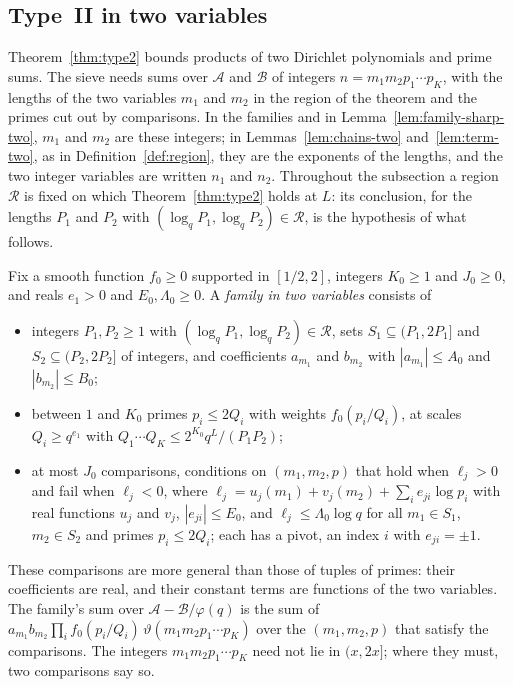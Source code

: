 \documentclass[11pt]{article}
\theoremstyle{definition}
\begin{document}
\subsection{Type~II in two variables}\label{sec:family-two}

Theorem~\ref{thm:type2} bounds products of two Dirichlet polynomials and prime sums. The sieve needs sums over
$\mathcal A$ and $\mathcal B$ of integers $n = m_1 m_2 p_1 \cdots p_K$, with the lengths of the two variables $m_1$ and
$m_2$ in the region of the theorem and the primes cut out by comparisons. In the families and in
Lemma~\ref{lem:family-sharp-two}, $m_1$ and $m_2$ are these integers; in Lemmas~\ref{lem:chains-two}
and~\ref{lem:term-two}, as in Definition~\ref{def:region}, they are the exponents of the lengths, and the two integer
variables are written $n_1$ and $n_2$. Throughout the subsection a region $\mathcal R$ is fixed on
which Theorem~\ref{thm:type2} holds at $L$: its conclusion, for the lengths $P_1$ and $P_2$ with
$(\log_q P_1, \log_q P_2) \in \mathcal R$, is the hypothesis of what follows.

Fix a smooth function $f_0 \ge 0$ supported in $[1/2, 2]$, integers $K_0 \ge 1$ and $J_0 \ge 0$, and reals $e_1 > 0$ and
$E_0, \Lambda_0 \ge 0$. A \emph{family in two variables} consists of
\begin{itemize}
\item integers $P_1, P_2 \ge 1$ with $(\log_q P_1, \log_q P_2) \in \mathcal R$, sets $S_1 \subseteq (P_1, 2P_1]$ and
  $S_2 \subseteq (P_2, 2P_2]$ of integers, and coefficients $a_{m_1}$ and $b_{m_2}$ with $|a_{m_1}| \le A_0$ and
  $|b_{m_2}| \le B_0$;
\item between $1$ and $K_0$ primes $p_i \le 2Q_i$ with weights $f_0(p_i/Q_i)$, at scales $Q_i \ge q^{e_1}$ with $Q_1
  \cdots Q_K \le 2^{K_0} q^L/(P_1 P_2)$;
\item at most $J_0$ comparisons, conditions on $(m_1, m_2, p)$ that hold when $\ell_j > 0$ and fail when $\ell_j < 0$,
  where $\ell_j = u_j(m_1) + v_j(m_2) + \sum_i e_{ji} \log p_i$ with real functions $u_j$ and $v_j$,
  $|e_{ji}| \le E_0$, and $\ell_j \le \Lambda_0 \log q$ for all $m_1 \in S_1$, $m_2 \in S_2$ and primes $p_i \le 2Q_i$;
  each has a pivot, an index $i$ with $e_{ji} = \pm 1$.
\end{itemize}
These comparisons are more general than those of tuples of primes: their coefficients are real, and their constant terms
are functions of the two variables. The family's sum over $\mathcal A - \mathcal B/\varphi(q)$ is the sum of $a_{m_1}
b_{m_2} \prod_i f_0(p_i/Q_i)\, \vartheta(m_1 m_2 p_1 \cdots p_K)$ over the $(m_1, m_2, p)$ that satisfy the comparisons.
The integers $m_1 m_2 p_1 \cdots p_K$ need not lie in $(x, 2x]$; where they must, two comparisons say so.
\end{document}
